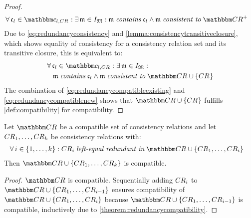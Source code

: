 \begin{proof}
\begin{align*}
        & \nonumber 
        \forall \conditionelement{c}{l} \in \condition{c}{l, \consistencyrelation{CR}{}} : \exists \modeltuple{m} \in \metamodeltupleinstanceset{M} : \modeltuple{m} \containsmath \conditionelement{c}{l} \land \modeltuple{m} \consistenttomath \transitiveclosure{\consistencyrelationset{CR}}
    \end{align*}
    Due to \autoref{eq:redundancyconsistency} and \autoref{lemma:consistencytransitiveclosure}, which shows equality of consistency for a consistency relation set and its transitive closure, this is equivalent to:
    \begin{align} \label{eq:redundancycompatiblenew}
        & \nonumber 
        \forall \conditionelement{c}{l} \in \condition{c}{l, \consistencyrelation{CR}{}} : \exists \modeltuple{m} \in \metamodeltupleinstanceset{M} : \\
        & \formulaskip
        \modeltuple{m} \containsmath \conditionelement{c}{l} \land \modeltuple{m} \consistenttomath \consistencyrelationset{CR} \cup \setted{\consistencyrelation{CR}{}}
    \end{align}
    The combination of \autoref{eq:redundancycompatibleexisting} and \autoref{eq:redundancycompatiblenew} shows that $\consistencyrelationset{CR} \cup \setted{\consistencyrelation{CR}{}}$ fulfills \autoref{def:compatibility} for compatibility.
\end{proof}

\begin{corollary} \label{corollary:transitiveredundancycompatibility}
    Let $\consistencyrelationset{CR}$ be a compatible set of consistency relations and let $\consistencyrelation{CR}{1}, \dots, \consistencyrelation{CR}{k}$ be consistency relations with:
    \begin{align*}
        &
        \forall i \in \setted{1, \dots, k} : \consistencyrelation{CR}{i} \leftequalredundantinmath \consistencyrelationset{CR} \cup \setted{\consistencyrelation{CR}{1}, \dots, \consistencyrelation{CR}{i}}
    \end{align*}
    Then $\consistencyrelationset{CR} \cup \setted{\consistencyrelation{CR}{1}, \dots, \consistencyrelation{CR}{k}}$ is compatible.
\end{corollary}

\begin{proof}
    $\consistencyrelationset{CR}$ is compatible. Sequentially adding $\consistencyrelation{CR}{i}$ to $\consistencyrelationset{CR} \cup \setted{\consistencyrelation{CR}{1}, \dots, \consistencyrelation{CR}{i-1}}$ ensures compatibility of $\consistencyrelationset{CR} \cup \setted{\consistencyrelation{CR}{1}, \dots, \consistencyrelation{CR}{i}}$ because $\consistencyrelationset{CR} \cup \setted{\consistencyrelation{CR}{1}, \dots, \consistencyrelation{CR}{i-1}}$ is compatible, inductively due to \autoref{theorem:redundancycompatibility}.
\end{proof}

